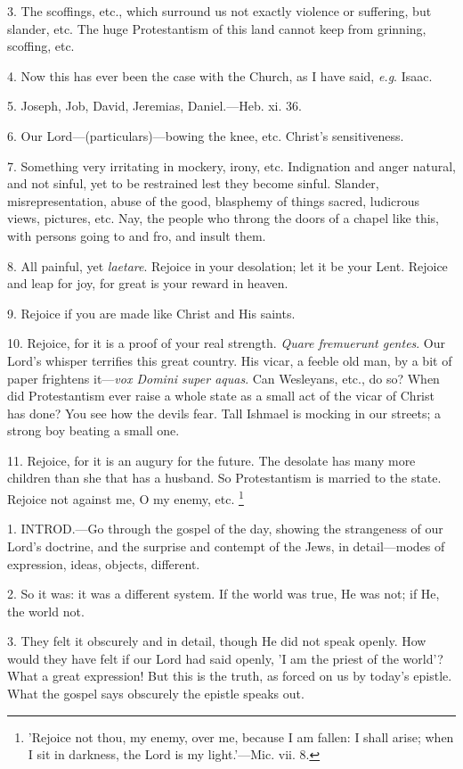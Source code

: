 3. The scoffings, etc., which surround us not
exactly violence or suffering, but slander, etc. The huge
Protestantism of this land cannot keep from grinning, scoffing, etc.

4. Now this has ever been the case with the
Church, as I have said, \emph{e.g}. Isaac.

5. Joseph, Job, David, Jeremias, Daniel.—Heb.
xi. 36.

6. Our Lord—(particulars)—bowing the knee,
etc. Christ's sensitiveness.

7. Something very irritating in mockery, irony,
etc. Indignation and anger natural, and not sinful, yet to be
restrained lest they become sinful. Slander, misrepresentation, abuse
of the good, blasphemy of things sacred, ludicrous views, pictures,
etc. Nay, the people who throng the doors of a chapel like this, with
persons going to and fro, and insult them.

8. All painful, yet \emph{laetare}. Rejoice in
your desolation; let it be your Lent. Rejoice and leap for joy, for
great is your reward in heaven.

9. Rejoice if you are made like Christ and His
saints.

10. Rejoice, for it is a proof of your real
strength. \emph{Quare fremuerunt gentes}. Our Lord's whisper terrifies
this great country. His vicar, a feeble old man, by a bit of
paper frightens it—\emph{vox Domini super aquas}. Can Wesleyans,
etc., do so? When did Protestantism ever raise a whole state as a
small act of the vicar of Christ has done? You see how the devils
fear. Tall Ishmael is mocking in our streets; a strong boy beating a
small one.

11. Rejoice, for it is an augury for the future.
The desolate has many more children than she that has a husband. So
Protestantism is married to the state. Rejoice not against me, O my
enemy, etc. \footnote{'Rejoice not thou, my
enemy, over me, because I am fallen: I shall arise; when I sit in
darkness, the Lord is my light.'—Mic. vii. 8.}


1. INTROD.—Go
through the gospel of the day, showing the strangeness of our Lord's
doctrine, and the surprise and contempt of the Jews, in detail—modes
of expression, ideas, objects, different.

2. So it was: it was a different system. If the
world was true, He was not; if He, the world not.

3. They felt it obscurely and in detail, though
He did not speak openly. How would they have felt if our Lord had said
openly, 'I am the priest of the world'? What a great expression! But
this is the truth, as forced on us by today's epistle. What the gospel
says obscurely the epistle speaks out.

